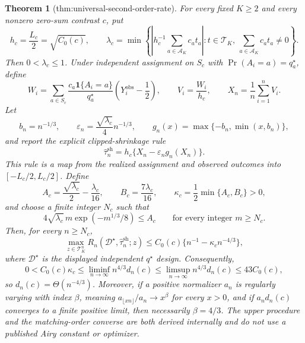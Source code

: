 \documentclass{article}
\newtheorem{theorem}{Theorem}
\begin{document}
\begin{theorem}[thm:universal-second-order-rate]\label{thm:universal-second-order-rate}
For every fixed \(K\geq2\) and every nonzero zero-sum contrast \(c\), put
\[
 h_c=\frac{L_c}{2}=\sqrt{C_0(c)},
 \qquad
 \lambda_c=\min\left\{
 \left|h_c^{-1}\sum_{a\in\mathcal A_K}c_at_a\right|:
 t\in\mathcal T_K,\ \sum_{a\in\mathcal A_K}c_at_a\neq0
 \right\}.
\]
Then \(0<\lambda_c\leq1\). Under independent assignment on \(S_c\) with \(\Pr(A_i=a)=q_a^\star\), define
\[
 W_i=\sum_{a\in S_c}\frac{c_a\mathbf 1\{A_i=a\}}{q_a^\star}
 \left(Y_i^{\mathrm{obs}}-\frac12\right),
 \qquad V_i=\frac{W_i}{h_c},
 \qquad X_n=\frac1n\sum_{i=1}^nV_i.
\]
Let
\[
 b_n=n^{-1/3},\qquad
 \varepsilon_n=\frac{\sqrt{\lambda_c}}4n^{-1/3},\qquad
 g_n(x)=\max\{-b_n,\min(x,b_n)\},
\]
and report the explicit clipped-shrinkage rule
\[
 \widehat\tau_n^{\mathrm{sh}}=h_c\{X_n-\varepsilon_ng_n(X_n)\}.
\]
This rule is a map from the realized assignment and observed outcomes into \([-L_c/2,L_c/2]\). Define
\[
 A_c=\frac{\sqrt{\lambda_c}}2-\frac{\lambda_c}{16},
 \qquad B_c=\frac{7\lambda_c}{16},
 \qquad \kappa_c=\frac12\min\{A_c,B_c\}>0,
\]
and choose a finite integer \(N_c\) such that
\[
 4\sqrt{\lambda_c}\,m\exp(-m^{1/3}/8)\leq A_c
 \qquad\text{for every integer }m\geq N_c.
\]
Then, for every \(n\geq N_c\),
\[
 \max_{z\in\mathcal T_K^n}
 R_n(\mathcal D^\star,\widehat\tau_n^{\mathrm{sh}};z)
 \leq C_0(c)\{n^{-1}-\kappa_cn^{-4/3}\},
\]
where \(\mathcal D^\star\) is the displayed independent \(q^\star\) design. Consequently,
\[
 0<C_0(c)\kappa_c
 \leq\liminf_{n\to\infty}n^{4/3}d_n(c)
 \leq\limsup_{n\to\infty}n^{4/3}d_n(c)
 \leq43C_0(c),
\]
so \(d_n(c)=\Theta(n^{-4/3})\). Moreover, if a positive normalizer \(a_n\) is regularly varying with index \(\beta\), meaning \(a_{\lfloor xn\rfloor}/a_n\to x^\beta\) for every \(x>0\), and if \(a_nd_n(c)\) converges to a finite positive limit, then necessarily \(\beta=4/3\). The upper procedure and the matching-order converse are both derived internally and do not use a published Airy constant or optimizer.
\end{theorem}
\end{document}

